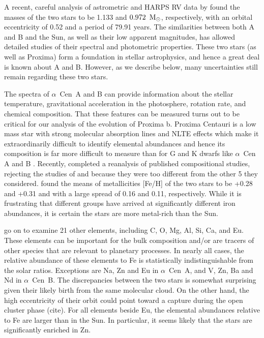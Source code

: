 \documentclass[preprint,12pt]{aastex}
\newcommand{\xxx}[1]{{\color{red} #1}} %
\def\msun{{\rm\,M_\odot}}
\def\acen{{$\alpha$~Cen}}
\begin{document}
A recent, careful analysis of astrometric and HARPS RV data by
\cite{PourbaixBoffin16} found the masses of the two stars to be 1.133
and $0.972~\msun$, respectively, with an orbital eccentricity of 0.52
and a period of 79.91 years. The similarities between both A and B and
the Sun, as well as their low apparent magnitudes, has allowed
detailed studies of their spectral and photometric properties. These
two stars (as well as Proxima) form a foundation in stellar astrophysics,
and hence a great deal is known about A and B. However, as we describe
below, many uncertainties still remain regarding these two stars.

The spectra of \acen~A and B can provide information about the stellar
temperature, gravitational acceleration in the photosphere, rotation
rate, and chemical composition. That these features can be
measured turns out to be critical for our analysis of the evolution of
Proxima b. Proxima Centauri is a low mass star with strong molecular
absorption lines and NLTE effects which make it extraordinarily
difficult to identify elemental abundances and hence its composition
is far more difficult to measure than for G and K dwarfs like \acen~ A
and B \citep{Johnson2009}.  Recently, \cite{HinkelKane13} completed a
reanalysis of published compositional studies, rejecting the studies
of \cite{Laird85} and \cite{NeuforgeMagain97} because they were too
different from the other 5 they considered.  \cite{HinkelKane13}
  found the means of metallicities [Fe/H] of the two stars to be
+0.28 and +0.31 and with a large spread of 0.16 and 0.11,
respectively. While it is frustrating that different groups have
arrived at significantly different iron abundances, it is certain the
stars are more metal-rich than the Sun.

\cite{HinkelKane13} go on to examine 21 other elements, including C,
O, Mg, Al, Si, Ca, and Eu. These elements can be important for the
bulk composition and/or are tracers of other species that are relevant
to planetary processes. In nearly all cases, the relative abundance of
these elements to Fe is statistically indistinguishable from the solar
ratios. Exceptions are Na, Zn and Eu in \acen~A, and V, Zn, Ba
and Nd in \acen~B. The discrepancies between the two stars is
somewhat surprising given their likely birth from the same molecular
cloud. On the other hand, the high eccentricity of their orbit could
point toward a capture during the open cluster phase \xxx{(cite)}. For all
elements beside Eu, the elemental abundances relative to Fe are larger
than in the Sun. In particular, it seems likely that the stars are
significantly enriched in Zn.
\end{document}
